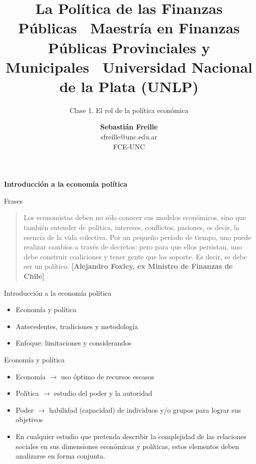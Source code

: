 \documentclass[
  ignorenonframetext,
]{beamer}
\title{La Política de las Finanzas Públicas ~Maestría en Finanzas
Públicas Provinciales y Municipales ~Universidad Nacional de la Plata
(UNLP)}
\subtitle{Clase 1. El rol de la política económica}
\author{\textbf{Sebastián Freille}\\
sfreille@unc.edu.ar\\
FCE-UNC}
\date{}
\providecommand{\tightlist}{%
  \setlength{\itemsep}{0pt}\setlength{\parskip}{0pt}}\usepackage{longtable,booktabs,array}
\begin{document}
\frame{\titlepage}
\ifdefined\Shaded\renewenvironment{Shaded}{\begin{tcolorbox}[interior hidden, enhanced, borderline west={3pt}{0pt}{shadecolor}, boxrule=0pt, frame hidden, breakable, sharp corners]}{\end{tcolorbox}}\fi

\begin{frame}{\textbf{Introducción a la economía política}}
\protect\hypertarget{introducciuxf3n-a-la-economuxeda-poluxedtica}{}
\begin{block}{Frases}
\protect\hypertarget{frases}{}
\begin{quote}
Los economistas deben no sólo conocer sus modelos económicos, sino que
también entender de política, intereses, conflictos, pasiones, es decir,
la esencia de la vida colectiva. Por un pequeño período de tiempo, uno
puede realizar cambios a través de decretos: pero para que ellos
persistan, uno debe construir coaliciones y tener gente que los soporte.
Es decir, se debe ser un político. \textbf{{[}Alejandro Foxley, ex
Ministro de Finanzas de Chile{]}}
\end{quote}
\end{block}

\begin{block}{Introducción a la economía política}
\protect\hypertarget{introducciuxf3n-a-la-economuxeda-poluxedtica-1}{}
\begin{itemize}
\tightlist
\item
  Economía y política
\item
  Antecedentes, tradiciones y metodología
\item
  Enfoque: limitaciones y considerandos
\end{itemize}
\end{block}

\begin{block}{Economía y política}
\protect\hypertarget{economuxeda-y-poluxedtica}{}
\begin{itemize}
\tightlist
\item
  Economía \(\longrightarrow\) uso óptimo de recursos escasos
\item
  Política \(\longrightarrow\) estudio del poder y la autoridad
\item
  Poder \(\longrightarrow\) habilidad (capacidad) de individuos y/o
  grupos para lograr sus objetivos
\item
  En cualquier estudio que pretenda describir la complejidad de las
  relaciones sociales en sus dimensiones económicas y políticas, estos
  elementos deben analizarse en forma conjunta.
\end{itemize}
\end{block}


\end{frame}
\end{document}
